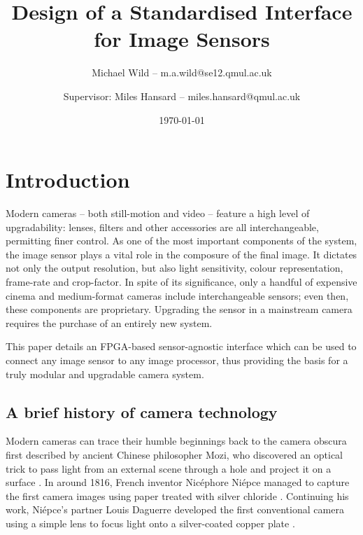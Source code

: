 \documentclass[a4paper]{report}
\title{Design of a Standardised Interface for Image Sensors}
\author{Michael Wild -- m.a.wild@se12.qmul.ac.uk \and Supervisor: Miles Hansard -- miles.hansard@qmul.ac.uk}
\date{\today}
\begin{document}
\maketitle

\tableofcontents

\listoffigures

\listoftables

\chapter{Introduction}

Modern cameras -- both still-motion and video -- feature a high level of upgradability: lenses, filters and other accessories are all interchangeable, permitting finer control. As one of the most important components of the system, the image sensor plays a vital role in the composure of the final image. It dictates not only the output resolution, but also light sensitivity, colour representation, frame-rate and crop-factor. In spite of its significance, only a handful of expensive cinema and medium-format cameras include interchangeable sensors; even then, these components are proprietary. Upgrading the sensor in a mainstream camera requires the purchase of an entirely new system.

This paper details an FPGA-based sensor-agnostic interface which can be used to connect any image sensor to any image processor, thus providing the basis for a truly modular and upgradable camera system.

\section{A brief history of camera technology}

Modern cameras can trace their humble beginnings back to the camera obscura first described by ancient Chinese philosopher Mozi, who discovered an optical trick to pass light from an external scene through a hole and project it on a surface \cite{1_woolfson_2012}. In around 1816, French inventor Nicéphore Niépce managed to capture the first camera images using paper treated with silver chloride \cite{2_stokstad_cateforis_addiss_2005}. Continuing his work, Niépce's partner Louis Daguerre developed the first conventional camera using a simple lens to focus light onto a silver-coated copper plate \cite{3_harvard_library_preservation}.
\end{document}
